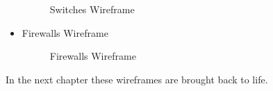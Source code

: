 \documentclass[a4Paper,12pt]{report}
\begin{document}
\begin{itemize}
\begin{figure}[H]
\caption{Switches Wireframe}
\end{figure}
\item Firewalls Wireframe
\begin{figure}[H]
\centering
{}
\caption{Firewalls Wireframe}
\end{figure}
\end{itemize}
In the next chapter these wireframes are brought back to life. 
\end{document}
